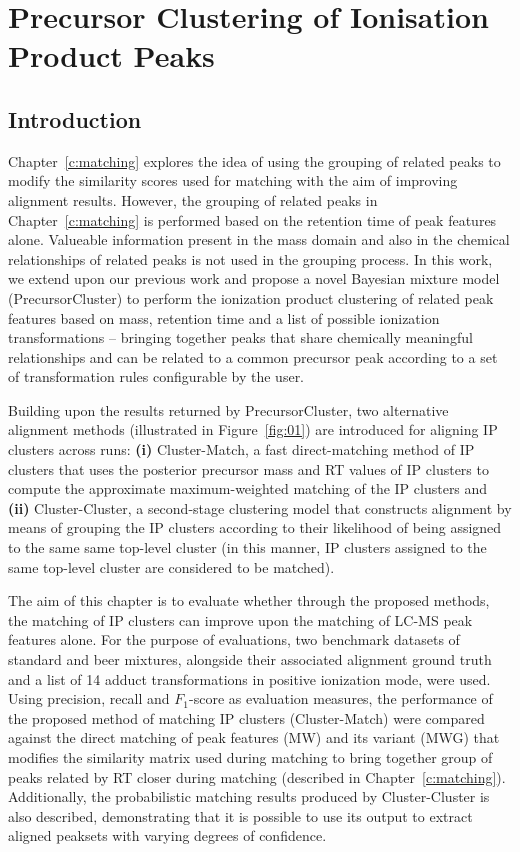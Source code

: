 \chapter{Precursor Clustering of Ionisation Product Peaks}
\label{c:precursor-clustering}

\section{Introduction}

Chapter~\ref{c:matching} explores the idea of using the grouping of related peaks to modify the similarity scores  used for matching with the aim of improving alignment results. However, the grouping of related peaks in Chapter~\ref{c:matching} is performed based on the retention time of peak features alone. Valueable information present in the mass domain and also in the chemical relationships of related peaks is not used in the grouping process. In this work, we extend upon our previous work and propose a novel Bayesian mixture model (PrecursorCluster) to perform the ionization product clustering of related peak features based on mass, retention time and a list of possible ionization transformations -- bringing together peaks that share chemically meaningful relationships and can be related to a common precursor peak according to a set of transformation rules configurable by the user. 

Building upon the results returned by PrecursorCluster, two alternative alignment methods (illustrated in Figure~\ref{fig:01}) are introduced for aligning IP clusters across runs: \textbf{(i)} Cluster-Match, a fast direct-matching method of IP clusters that uses the posterior precursor mass and RT values of IP clusters to compute the approximate maximum-weighted matching of the IP clusters and \textbf{(ii)} Cluster-Cluster, a second-stage clustering model that constructs alignment by means of grouping the IP clusters according to their likelihood of being assigned to the same same top-level cluster (in this manner, IP clusters assigned to the same top-level cluster are considered to be matched). 

The aim of this chapter is to evaluate whether through the proposed methods, the matching of IP clusters can improve upon the matching of LC-MS peak features alone. For the purpose of evaluations, two benchmark datasets of standard and beer mixtures, alongside their associated alignment ground truth and a list of 14 adduct transformations in positive ionization mode, were used. Using precision, recall and $F_1$-score as evaluation measures, the performance of the proposed method of matching IP clusters (Cluster-Match) were compared against the direct matching of peak features (MW) and its variant (MWG) that modifies the similarity matrix used during matching to bring together group of peaks related by RT closer during matching (described in Chapter~\ref{c:matching}). Additionally, the probabilistic matching results produced by Cluster-Cluster is also described, demonstrating that it is possible to use its output to extract aligned peaksets with varying degrees of confidence.

